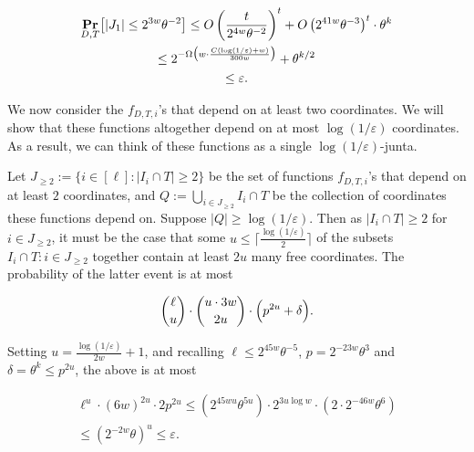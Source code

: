 \documentclass[10pt,a4paper]{article}
\begin{document}
\[\begin{gathered}
\displaystyle\mathop{\bf Pr\/}_{D,T}\bigl{[}\lvert J_{1}\rvert\leq 2^{3w}\theta^{-2}\bigr{]} \displaystyle\leq O\left(\frac{t}{2^{4w}\theta^{-2}}\right)^{t}+O\left(2^{41w}\theta^{-3}\right)^{t}\cdot\theta^{k} \\
\displaystyle\leq 2^{-\Omega\bigl{(}w\cdot\frac{C(\log(1/\varepsilon)+w)}{300w}\bigr{)}}+\theta^{k/2} \\
\displaystyle\leq\varepsilon.
\end{gathered}\]




We now consider the $f_{D,T,i}$’s that depend on at least two coordinates.
We will show that these functions altogether depend on at most $\log(1/\varepsilon)$ coordinates.
As a result, we can think of these functions as a single $\log(1/\varepsilon)$-junta.\par




Let $J_{\geq 2}:=\{i\in[\ell]:\lvert I_{i}\cap T\rvert\geq 2\}$ be the set of functions $f_{D,T,i}$’s that depend on at least $2$ coordinates, and $Q:=\bigcup_{i\in J_{\geq 2}}I_{i}\cap T$ be the collection of coordinates these functions depend on.
Suppose $\lvert Q\rvert\geq\log(1/\varepsilon)$.
Then as $\lvert I_{i}\cap T\rvert\geq 2$ for $i\in J_{\geq 2}$, it must be the case that some $u\leq\lceil\frac{\log(1/\varepsilon)}{2}\rceil$ of the subsets $I_{i}\cap T:i\in J_{\geq 2}$ together contain at least $2u$ many free coordinates.
The probability of the latter event is at most\par


\[\begin{gathered}
\binom{\ell}{u}\cdot\binom{u\cdot 3w}{2u}\cdot\Bigl{(}p^{2u}+\delta\Bigr{)}.
\end{gathered}\]


Setting $u=\frac{\log(1/\varepsilon)}{2w}+1$, and recalling $\ell\leq 2^{45w}\theta^{-5}$, $p=2^{-23w}\theta^{3}$ and $\delta=\theta^{k}\leq p^{2u}$, the above is at most\par


\[\begin{gathered}
\displaystyle\ell^{u}\cdot(6w)^{2u}\cdot 2p^{2u} \displaystyle\leq(2^{45wu}\theta^{5u})\cdot 2^{3u\log w}\cdot(2\cdot 2^{-46w}\theta^{6}) \\
\displaystyle\leq(2^{-2w}\theta)^{u}\leq\varepsilon.
\end{gathered}\]
\end{document}
